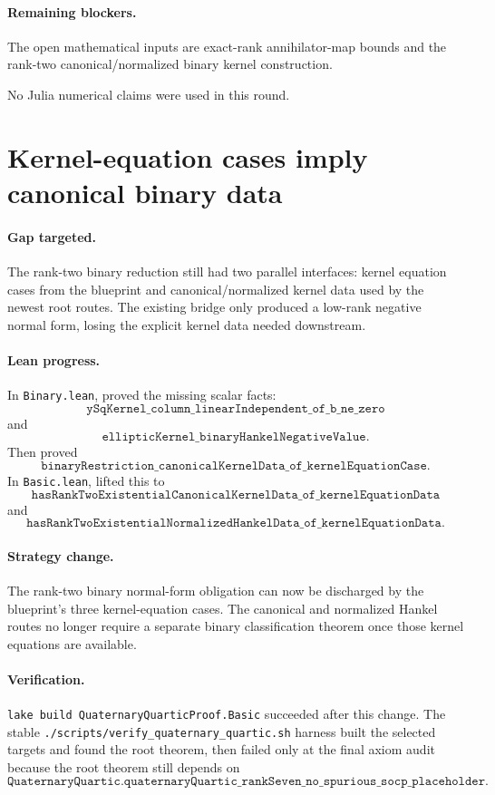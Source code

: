 \documentclass[11pt]{article}
\begin{document}
\paragraph{Remaining blockers.}
The open mathematical inputs are exact-rank annihilator-map bounds and the
rank-two canonical/normalized binary kernel construction.

No Julia numerical claims were used in this round.

\section*{Kernel-equation cases imply canonical binary data}

\paragraph{Gap targeted.}
The rank-two binary reduction still had two parallel interfaces: kernel
equation cases from the blueprint and canonical/normalized kernel data used by
the newest root routes.  The existing bridge only produced a low-rank negative
normal form, losing the explicit kernel data needed downstream.

\paragraph{Lean progress.}
In \texttt{Binary.lean}, proved the missing scalar facts:
\[
\texttt{ySqKernel\_column\_linearIndependent\_of\_b\_ne\_zero}
\]
and
\[
\texttt{ellipticKernel\_binaryHankelNegativeValue}.
\]
Then proved
\[
\texttt{binaryRestriction\_canonicalKernelData\_of\_kernelEquationCase}.
\]
In \texttt{Basic.lean}, lifted this to
\[
\texttt{hasRankTwoExistentialCanonicalKernelData\_of\_kernelEquationData}
\]
and
\[
\texttt{hasRankTwoExistentialNormalizedHankelData\_of\_kernelEquationData}.
\]

\paragraph{Strategy change.}
The rank-two binary normal-form obligation can now be discharged by the
blueprint's three kernel-equation cases.  The canonical and normalized Hankel
routes no longer require a separate binary classification theorem once those
kernel equations are available.

\paragraph{Verification.}
\texttt{lake build QuaternaryQuarticProof.Basic} succeeded after this change.
The stable \texttt{./scripts/verify\_quaternary\_quartic.sh} harness built the
selected targets and found the root theorem, then failed only at the final axiom
audit because the root theorem still depends on
\[
\texttt{QuaternaryQuartic.quaternaryQuartic\_rankSeven\_no\_spurious\_socp\_placeholder}.
\]
\end{document}
